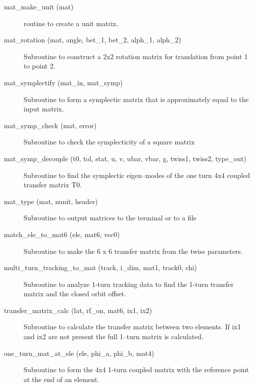 \begin{description}
\item[mat_make_unit (mat)] \Newline 
     routine to create a unit matrix.

\item[mat_rotation (mat, angle, bet_1, bet_2, alph_1, alph_2)] \Newline 
     Subroutine to construct a 2x2 rotation matrix for translation from
     point 1 to point 2.

\item[mat_symplectify (mat_in, mat_symp)] \Newline
Subroutine to form a symplectic matrix that is approximately equal to the input matrix. 

\item[mat_symp_check (mat, error)] \Newline
Subroutine to check the symplecticity of a square matrix 

\item[mat_symp_decouple (t0, tol, stat, u, v, ubar, vbar, g, twiss1, twiss2, type_out)] \Newline
Subroutine to find the symplectic eigen--modes of the one turn 4x4 coupled 
transfer matrix T0. 

\item[mat_type (mat, nunit, header)] \Newline 
     Subroutine to output matrices to the terminal or to a file

\item[match_ele_to_mat6 (ele, mat6, vec0)] \Newline 
Subroutine to make the 6 x 6 transfer matrix from the twiss parameters.

\item[multi_turn_tracking_to_mat (track, i_dim, mat1, track0, chi)] \Newline
Subroutine to analyze 1-turn tracking data to find the 1-turn transfer matrix 
and the closed orbit offset.

\item[transfer_matrix_calc (lat, rf_on, mat6, ix1, ix2)] \Newline
Subroutine to calculate the transfer matrix between two elements. If
ix1 and ix2 are not present the full 1--turn matrix is calculated.

\item[one_turn_mat_at_ele (ele, phi_a, phi_b, mat4)] \Newline
Subroutine to form the 4x4 1-turn coupled matrix with the reference point 
at the end of an element. 


\end{description}
